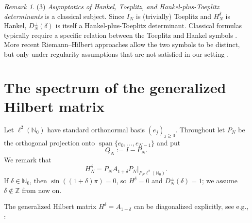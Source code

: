 \documentclass[11pt,a4paper,reqno]{amsart}
\theoremstyle{remark}
\newtheorem{remark}[theorem]{Remark}
\newcommand{\Nzero}{\mathbb N_0}
\newcommand{\id}{I}
\begin{document}
\begin{remark}
(3) \emph{Asymptotics of Hankel, Toeplitz, and Hankel-plus-Toeplitz determinants}
is a classical subject. Since $\id_N$ is (trivially) Toeplitz and $H_N^\delta$
is Hankel, $D_N^\pm(\delta)$ is itself a Hankel-plus-Toeplitz determinant.
Classical formulas typically require a specific relation between the Toeplitz and
Hankel symbols \cite{BasorEhrhardt,DeiftItsKrasovsky}. More recent
Riemann--Hilbert approaches allow the two symbols to be distinct, but only under
regularity assumptions that are not satisfied in our setting
\cite{GharakhlooIts,GharakhlooItsII}.
\end{remark}

\section{The spectrum of the generalized Hilbert matrix}\label{sec:spectrum}

Let $\ell^2(\Nzero)$ have standard orthonormal basis $(e_j)_{j\ge0}$.  Throughout let $P_N$ be the orthogonal projection onto
$\operatorname{span}\{e_0,\ldots,e_{N-1}\}$ and put
\begin{equation}
    Q_N:=\id-P_N.
\end{equation}
We remark that
\begin{equation}\label{eq:compression}
 H_N^\delta=P_NA_{1+\delta} P_N\big|_{P_N\ell^2(\Nzero)}.
\end{equation}
If $\delta\in\Nzero$, then $\sin((1+\delta)\pi)=0$, so $H^\delta=0$ and
$D_N^\pm(\delta)=1$; we assume $\delta\notin\mathbb Z$ from now on.

The generalized Hilbert matrix $H^\delta = A_{1+\delta}$ can be diagonalized explicitly, see e.g., \cite{AlemanMontesSarafoleanu,RosenblumII,Silbermann}:
\end{document}
